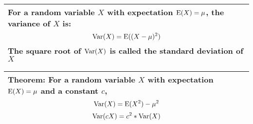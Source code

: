 {\tabulinesep=1mm
\begin{tabu}{|p{16cm} |}
\hline
\vspace{2 mm}
For a random variable $X$ with expectation $\text{E}(X) = \mu$, the variance 
of $X$ is:
\[\text{Var}(X) = \text{E}((X - \mu)^2)\]
The square root of $\text{Var}(X)$ is called the standard deviation of $X$
\vspace{2 mm}
\\
\hline
\end{tabu}
}

{\tabulinesep=1mm
\begin{tabu}{|p{16cm} |}
\hline
\vspace{2 mm}
\textbf{Theorem}: For a random variable $X$ with expectation $\text{E}(X) = \mu$ and a 
constant $c$,
\[\text{Var}(X) = \text{E}(X^2) - \mu^2\]
\[\text{Var}(cX) = c^2 * \text{Var}(X)\]
\vspace{2 mm}
\\
\hline
\end{tabu}
}